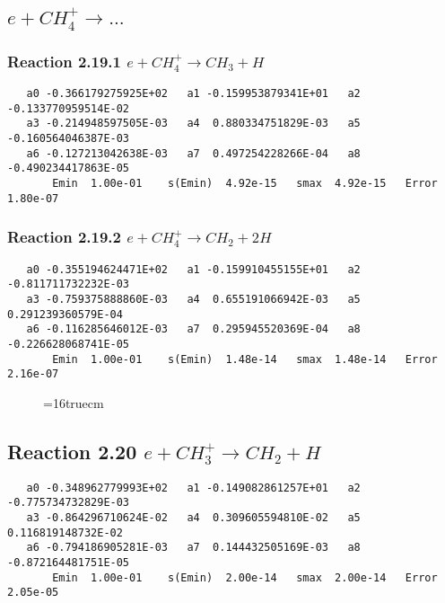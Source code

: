 \documentclass[12pt]{article}
\begin{document}
\subsection{ 
$e + CH_4^+ \rightarrow ...$
}

\subsubsection{
Reaction 2.19.1    $e + CH_4^+ \rightarrow CH_3 + H$
}

\begin{small}\begin{verbatim} 
   a0 -0.366179275925E+02   a1 -0.159953879341E+01   a2 -0.133770959514E-02
   a3 -0.214948597505E-03   a4  0.880334751829E-03   a5 -0.160564046387E-03
   a6 -0.127213042638E-03   a7  0.497254228266E-04   a8 -0.490234417863E-05
       Emin  1.00e-01    s(Emin)  4.92e-15   smax  4.92e-15   Error  1.80e-07
\end{verbatim}\end{small}

\subsubsection{
Reaction 2.19.2    $e + CH_4^+ \rightarrow CH_2 + 2H$
}

\begin{small}\begin{verbatim}
   a0 -0.355194624471E+02   a1 -0.159910455155E+01   a2 -0.811711732232E-03
   a3 -0.759375888860E-03   a4  0.655191066942E-03   a5  0.291239360579E-04
   a6 -0.116285646012E-03   a7  0.295945520369E-04   a8 -0.226628068741E-05
       Emin  1.00e-01    s(Emin)  1.48e-14   smax  1.48e-14   Error  2.16e-07
\end{verbatim}\end{small}

\begin{figure} \label{met.1_2.19}
\epsfxsize=16truecm
\end{figure}
\newpage

\subsection{ 
Reaction 2.20     $e + CH_3^+ \rightarrow CH_2 + H$
}

\begin{small}\begin{verbatim}
   a0 -0.348962779993E+02   a1 -0.149082861257E+01   a2 -0.775734732829E-03
   a3 -0.864296710624E-02   a4  0.309605594810E-02   a5  0.116819148732E-02
   a6 -0.794186905281E-03   a7  0.144432505169E-03   a8 -0.872164481751E-05
       Emin  1.00e-01    s(Emin)  2.00e-14   smax  2.00e-14   Error  2.05e-05
\end{verbatim}\end{small}
\end{document}
